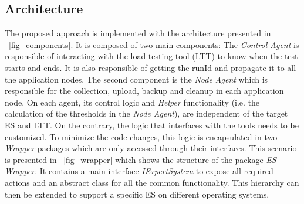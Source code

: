 \documentclass[runningheads,a4paper]{llncs}
\newcommand{\myspaceM}{-7.6pt}
\begin{document}
\subsection{Architecture}
\vspace{\myspaceM{}}
The proposed approach is implemented with the architecture
presented in \figurename ~\ref{fig_components}. It is composed of two main components:
The \emph{Control Agent} is responsible of interacting with the 
load testing tool (LTT) to know when the test starts and ends. It is also
responsible of getting the runId and propagate it to all the application nodes. The second component is the \emph{Node Agent} which is responsible for the collection, upload, backup and cleanup 
in each application node. On each agent, its control logic and
\emph{Helper} functionality (i.e. the calculation of the thresholds in the \emph{Node Agent}),
are independent of the target ES and LTT. On the contrary, the logic that interfaces 
with the tools needs to be customized. To minimize the code changes, this logic
is encapsulated in two \emph{Wrapper} packages which are only accessed through
their interfaces. This scenario is presented in \figurename ~\ref{fig_wrapper}
which shows the structure of the package \emph{ES Wrapper}. It contains a main interface
\emph{IExpertSystem} to expose all required actions and an abstract
class for all the common functionality. This hierarchy can then be extended to
support a specific ES on different operating systems.
\end{document}
